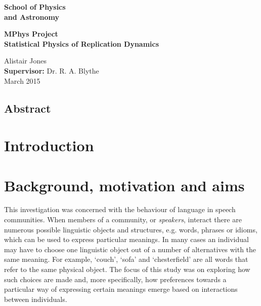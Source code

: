 \documentclass[12pt]{article}
\begin{document}

\begin{minipage}[b]{110mm}
        {\Huge\bf School of Physics\\ and Astronomy
        \vspace*{17mm}}
\end{minipage}
\hfill
\begin{minipage}[t]{40mm}               
\end{minipage}

\vspace*{2cm}
\begin{center}
        \Large\bf \Large\bf MPhys Project\\
        \LARGE\bf Statistical Physics of Replication Dynamics
\end{center}
\vspace*{0.5cm}
\begin{center}
        Alistair Jones\\  
        {\bf Supervisor:} Dr. R. A. Blythe \\          
        March 2015     
\end{center}

\begin{center}
\subsection*{Abstract}
\end{center}

\newpage
\tableofcontents

\newpage
{}

\section{Introduction}


\newpage
\section{Background, motivation and aims}
This investigation was concerned with the behaviour of language in speech communities. When members of a community, or \emph{speakers}, interact there are numerous possible linguistic objects and structures, e.g. words, phrases or idioms, which can be used to express particular meanings. In many cases an individual may have to choose one linguistic object out of a number of alternatives with the same meaning. For example, `couch', `sofa' and `chesterfield' are all words that refer to the same physical object. The focus of this study was on exploring how such choices are made and, more specifically, how preferences towards a particular way of expressing certain meanings emerge based on interactions between individuals. 
\end{document}
